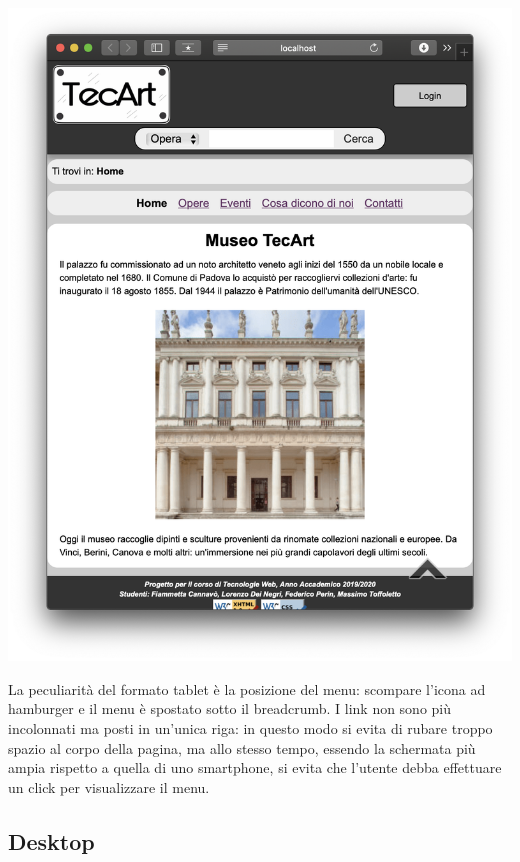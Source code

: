 \begin{center}
	\includegraphics[scale=0.45]{img/Tablet-pres}
\end{center}

La peculiarità del formato tablet è la posizione del menu: scompare l'icona ad hamburger e il menu è spostato sotto il breadcrumb. I link non sono più incolonnati ma posti in un'unica riga: in questo modo si evita di rubare troppo spazio al corpo della pagina, ma allo stesso tempo, essendo la schermata più ampia rispetto a quella di uno smartphone, si evita che l'utente debba effettuare un click per visualizzare il menu.


\subsection{Desktop}
\label{presentazione-desktop}

